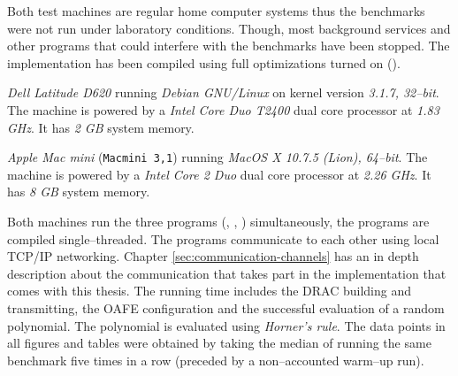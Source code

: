 \label{sec:evaluation}

%
%
\label{sec:test-setup}

\label{sec:test-machines}

Both test machines are regular home computer systems thus the benchmarks were
not run under laboratory conditions. Though, most background services and other
programs that could interfere with the benchmarks have been stopped. The
implementation has been compiled using full optimizations turned on
().



\emph{Dell Latitude D620} running \emph{Debian GNU/Linux} on kernel version
\emph{3.1.7, 32--bit}. The machine is powered by a \emph{Intel\TReg{} Core Duo
T2400} dual core processor at \emph{1.83 GHz}. It has \emph{2 GB} system memory.



\emph{Apple Mac mini} (\texttt{Macmini 3,1}) running \emph{MacOS X 10.7.5
(Lion), 64--bit}. The machine is powered by a \emph{Intel\TReg{} Core 2 Duo}
dual core processor at \emph{2.26 GHz}. It has \emph{8 GB} system memory.


Both machines run the three programs (\JWBpOne{}, \JWBpTwo{}, \JWBtoken{})
simultaneously, the programs are compiled single--threaded. The programs
communicate to each other using local TCP/IP networking. Chapter
\ref{sec:communication-channels} has an in depth description about the
communication that takes part in the implementation that comes with this thesis.
The running time includes the DRAC building and transmitting, the OAFE
configuration and the successful evaluation of a random polynomial. The
polynomial is evaluated using \emph{Horner's rule}\cite{cormen01}. The data
points in all figures and tables were obtained by taking the median of
running the same benchmark five times in a row (preceded by a non--accounted
warm--up run).


%
%
\label{sec:comp-complexity}

